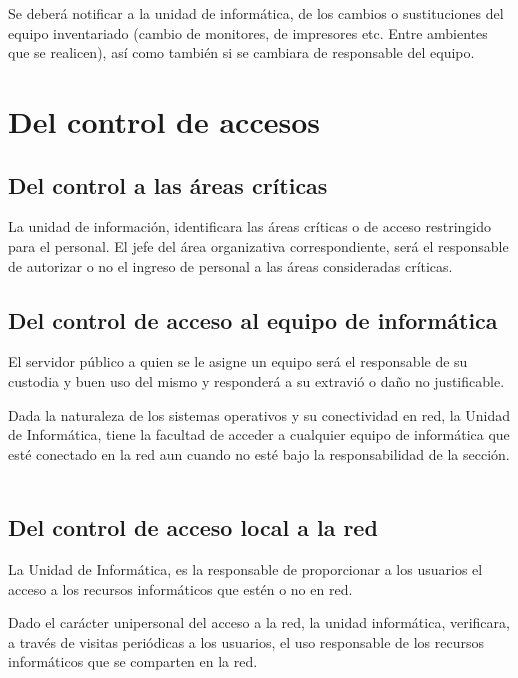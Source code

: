 \documentclass{book}
\begin{document}
            Se deberá notificar a la unidad de informática, de los cambios o sustituciones del
            equipo inventariado (cambio de monitores, de impresores etc. Entre ambientes que se
            realicen), así como también si se cambiara de responsable del equipo.
        \

        \section{Del control de accesos}
            \subsection{Del control a las áreas críticas}
                La unidad de información, identificara las áreas críticas o de acceso restringido
                para el personal.
                El jefe del área organizativa correspondiente, será el responsable de autorizar o
                no el ingreso de personal a las áreas consideradas críticas.
            \

            \subsection{Del control de acceso al equipo de informática}
                El servidor público a quien se le asigne un equipo será el responsable de su
                custodia y buen uso del mismo y responderá a su extravió o daño no justificable.

                Dada la naturaleza de los sistemas operativos y su conectividad en red, la
                Unidad de Informática, tiene la facultad de acceder a cualquier equipo de informática
                que esté conectado en la red aun cuando no esté bajo la responsabilidad de la sección.
            \

            \subsection{Del control de acceso local a la red}
                La Unidad de Informática, es la responsable de proporcionar a los usuarios el
                acceso a los recursos informáticos que estén o no en red.

                Dado el carácter unipersonal del acceso a la red, la unidad informática,
                verificara, a través de visitas periódicas a los usuarios, el uso responsable de los
                recursos informáticos que se comparten en la red.
\end{document}
